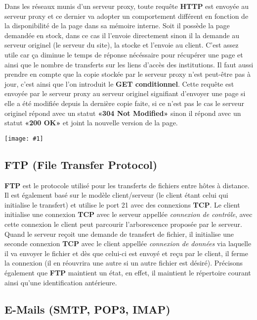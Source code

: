 \documentclass{article}
\newcommand{\imgRT}[2]{\begin{center}\texttt{[image: \#1]}\end{center}}
\begin{document}
Dans les réseaux munis d'un serveur proxy, toute requête \textbf{HTTP} est envoyée au serveur proxy et ce 
dernier va adopter un comportement différent en fonction de la disponibilité de la page dans sa mémoire interne. 
Soit il possède la page demandée en stock, dans ce cas il l'envoie directement sinon il la demande au serveur 
originel (le serveur du site), la stocke et l'envoie au client. C'est assez utile car ça diminue le 
temps de réponse nécéssaire pour récupérer une page et ainsi que le nombre de transferts sur les liens d'accès 
des institutions. Il faut aussi prendre en compte que la copie stockée par le serveur proxy n'est peut-être pas 
à jour, c'est ainsi que l'on introduit le \textbf{GET conditionnel}. Cette requête est envoyée par le serveur 
proxy au serveur originel signifiant d'envoyer une page si elle a été modifiée depuis la dernière copie faite, si 
ce n'est pas le cas le serveur originel répond avec un statut \textbf{«304 Not Modified»} sinon il répond avec 
un statut \textbf{«200 OK»} et joint la nouvelle version de la page.

\imgRT{CN_019.png}{150}

\subsection{FTP (File Transfer Protocol)}

\textbf{FTP} est le protocole utilisé pour les transferts de fichiers entre hôtes à distance. Il est également 
basé sur le modèle client/serveur (le client étant celui qui initialise le transfert) et utilise le port 21 avec 
des connexions \textbf{TCP}. Le client initialise une connexion \textbf{TCP} avec le serveur appellée 
\textit{connexion de contrôle}, avec cette connexion le client peut parcourir l'arborescence proposée par le 
serveur. Quand le serveur reçoit une demande de transfert de fichier, il initialise une seconde connexion 
\textbf{TCP} avec le client appellée \textit{connexion de données} via laquelle il va envoyer le fichier et dès
que celui-ci est envoyé et reçu par le client, il ferme la connexion (il en réouvrira une autre si un autre 
fichier est désiré). Précisons également que \textbf{FTP} maintient un état, en effet, il maintient le 
répertoire courant ainsi qu'une identification antérieure.

\subsection{E-Mails (SMTP, POP3, IMAP)}
\end{document}
